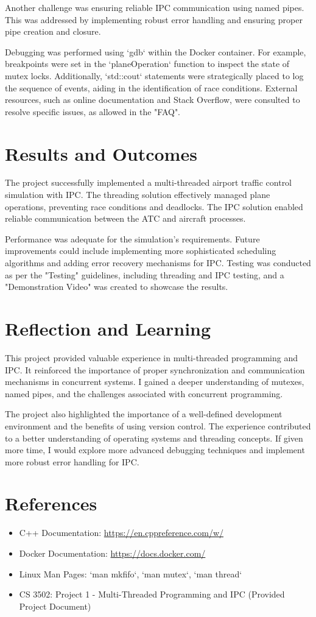 \documentclass{article}
\begin{document}
Another challenge was ensuring reliable IPC communication using named pipes. This was addressed by implementing robust error handling and ensuring proper pipe creation and closure.

Debugging was performed using `gdb` within the Docker container. For example, breakpoints were set in the `planeOperation` function to inspect the state of mutex locks. Additionally, `std::cout` statements were strategically placed to log the sequence of events, aiding in the identification of race conditions. External resources, such as online documentation and Stack Overflow, were consulted to resolve specific issues, as allowed in the "FAQ".

\section{Results and Outcomes}
The project successfully implemented a multi-threaded airport traffic control simulation with IPC. The threading solution effectively managed plane operations, preventing race conditions and deadlocks. The IPC solution enabled reliable communication between the ATC and aircraft processes.

Performance was adequate for the simulation's requirements. Future improvements could include implementing more sophisticated scheduling algorithms and adding error recovery mechanisms for IPC. Testing was conducted as per the "Testing" guidelines, including threading and IPC testing, and a "Demonstration Video" was created to showcase the results.

\section{Reflection and Learning}
This project provided valuable experience in multi-threaded programming and IPC. It reinforced the importance of proper synchronization and communication mechanisms in concurrent systems. I gained a deeper understanding of mutexes, named pipes, and the challenges associated with concurrent programming.

The project also highlighted the importance of a well-defined development environment and the benefits of using version control. The experience contributed to a better understanding of operating systems and threading concepts. If given more time, I would explore more advanced debugging techniques and implement more robust error handling for IPC.

\section{References}
\begin{itemize}
    \item C++ Documentation: \url{https://en.cppreference.com/w/}
    \item Docker Documentation: \url{https://docs.docker.com/}
    \item Linux Man Pages: `man mkfifo`, `man mutex`, `man thread`
    \item CS 3502: Project 1 - Multi-Threaded Programming and IPC (Provided Project Document)
\end{itemize}
\end{document}
